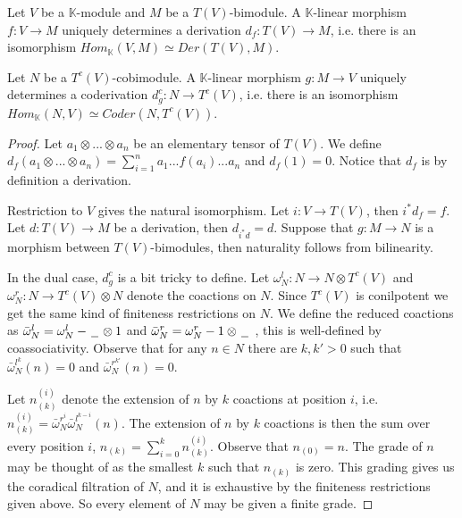 \documentclass[../thesis.tex]{subfiles}
\begin{document}
            \begin{proposition}\label{prop: tensor-derivation}
                Let $V$ be a $\mathbb{K}$-module and $M$ be a $T(V)$-bimodule. A $\mathbb{K}$-linear morphism $f:V\rightarrow M$ uniquely determines a derivation $d_f:T(V)\rightarrow M$, i.e. there is an isomorphism $Hom_{\mathbb{K}}(V,M)\simeq Der(T(V),M)$.


                Let $N$ be a $T^c(V)$-cobimodule. A $\mathbb{K}$-linear morphism $g:M\rightarrow V$ uniquely determines a coderivation $d_g^c:N\rightarrow T^c(V)$, i.e. there is an isomorphism $Hom_{\mathbb{K}}(N,V)\simeq Coder(N,T^c(V))$.
            \end{proposition}

            \begin{proof}
                Let $a_1\otimes ... \otimes a_n$ be an elementary tensor of $T(V)$. We define $d_f(a_1\otimes ... \otimes a_n) = \sum_{i=1}^n a_1...f(a_i)...a_n$ and $d_f(1) = 0$. Notice that $d_f$ is by definition a derivation.
                
                Restriction to $V$ gives the natural isomorphism. Let $i : V\rightarrow T(V)$, then $i^*d_f = f$. Let $d : T(V) \rightarrow M$ be a derivation, then $d_{i^*d}=d$. Suppose that $g: M \rightarrow N$ is a morphism between $T(V)$-bimodules, then naturality follows from bilinearity.

                In the dual case, $d_g^c$ is a bit tricky to define. Let $\omega^l_N:N\rightarrow N\otimes T^c(V)$ and $\omega^r_N : N\rightarrow T^c(V) \otimes N$ denote the coactions on $N$. Since $T^c(V)$ is conilpotent we get the same kind of finiteness restrictions on $N$. We define the reduced coactions as $\bar{\omega}^l_N = \omega^l_N - \hspace{0.05cm}\underline{\hspace{0.2cm}}\hspace{0.05cm}\otimes 1$ and $\bar{\omega}^r_N = \omega^r_N - 1\otimes\hspace{0.05cm}\underline{\hspace{0.2cm}}\hspace{0.05cm}\ $, this is well-defined by coassociativity. Observe that for any $n\in N$ there are $k, k'>0$ such that ${\bar{\omega}^{l^k}_N}(n) = 0$ and ${\bar{\omega}^{r^{k'}}_N}(n)=0$.

                Let $n_{(k)}^{(i)}$ denote the extension of $n$ by $k$ coactions at position $i$, i.e. $n_{(k)}^{(i)} = \bar{\omega}^{r^i}_N\bar{\omega}^{l^{k-i}}_N(n)$. The extension of $n$ by $k$ coactions is then the sum over every position $i$, $n_{(k)} = \sum_{i=0}^kn_{(k)}^{(i)}$. Observe that $n_{(0)} = n$. The grade of $n$ may be thought of as the smallest $k$ such that $n_{(k)}$ is zero. This grading gives us the coradical filtration of $N$, and it is exhaustive by the finiteness restrictions given above. So every element of $N$ may be given a finite grade.


\end{proof}
\end{document}
